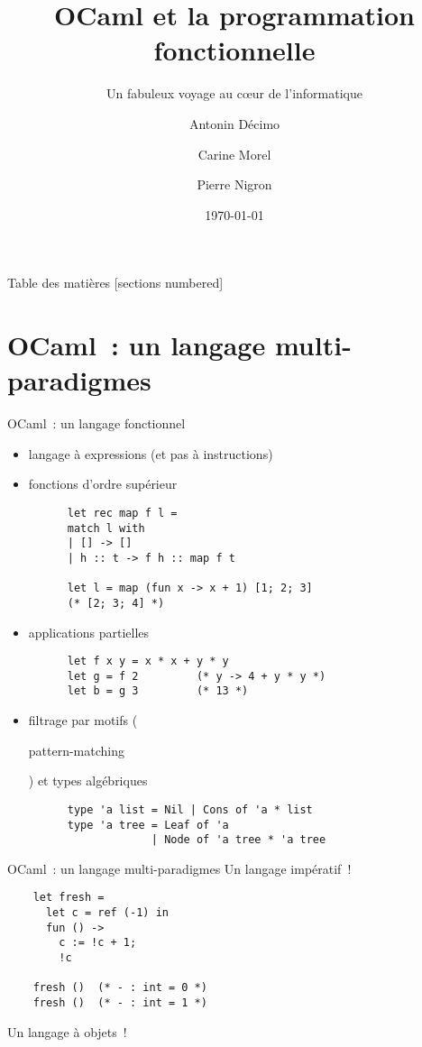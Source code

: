 \documentclass[10pt]{beamer}
\title{OCaml et la programmation fonctionnelle}
\subtitle{Un fabuleux voyage au cœur de l’informatique}
\date{\today}
\author{Antonin Décimo \and Carine Morel \and Pierre Nigron}
\institute{Université Paris Diderot}
\begin{document}
\maketitle

\begin{frame}{Table des matières}
  [sections numbered]
  \tableofcontents[hideallsubsections]
\end{frame}

\section{OCaml~: un langage multi-paradigmes}

\begin{frame}[fragile]{OCaml~: un langage fonctionnel}
  \begin{itemize}
  \item<1-> langage à expressions (et pas à instructions)
  \item<2-> fonctions d'ordre supérieur
    \begin{verbatim}
      let rec map f l =
      match l with
      | [] -> []
      | h :: t -> f h :: map f t

      let l = map (fun x -> x + 1) [1; 2; 3]
      (* [2; 3; 4] *)
    \end{verbatim}
  \item<3-> applications partielles
    \begin{verbatim}
      let f x y = x * x + y * y
      let g = f 2         (* y -> 4 + y * y *)
      let b = g 3         (* 13 *)
    \end{verbatim}
  \item<4-> filtrage par motifs
    (\begin{english}pattern-matching\end{english}) et types
    algébriques
    \begin{verbatim}
      type 'a list = Nil | Cons of 'a * list
      type 'a tree = Leaf of 'a
                   | Node of 'a tree * 'a tree
    \end{verbatim}
  \end{itemize}
\end{frame}

\begin{frame}[fragile]{OCaml~: un langage multi-paradigmes}
  Un langage impératif~!
  \begin{verbatim}
    let fresh =
      let c = ref (-1) in
      fun () ->
        c := !c + 1;
        !c

    fresh ()  (* - : int = 0 *)
    fresh ()  (* - : int = 1 *)
  \end{verbatim}

  Un langage à objets~!
\end{frame}
\end{document}
